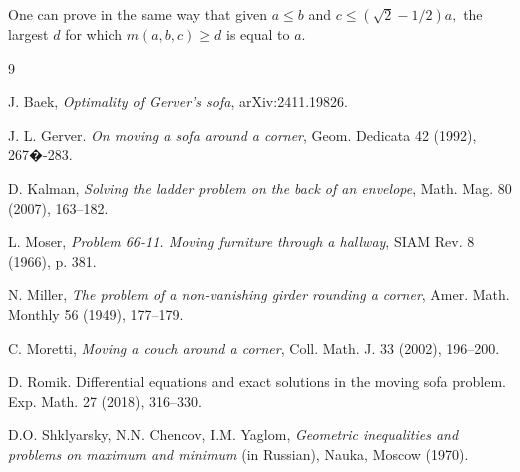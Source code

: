 \documentclass[12pt]{amsart}
\begin{document}
One can prove in the same way that given $a\le b$ and $c\le(\sqrt
2-1/2)a,$ the largest $d$ for which $m(a,b,c)\ge d$ is equal to $a.$

\begin{thebibliography}{9}

 J. Baek, {\it Optimality of Gerver's sofa}, arXiv:2411.19826.

 J. L. Gerver. {\it On moving a sofa around a corner}, Geom. Dedicata
42 (1992), 267�-283.

 D. Kalman, {\it Solving the ladder problem on the back of an envelope},
Math. Mag. 80 (2007), 163--182.

 L. Moser, {\it Problem 66-11. Moving furniture through a hallway}, SIAM
Rev. 8 (1966), p. 381.

 N. Miller, {\it The problem of a non-vanishing girder rounding a corner},
Amer. Math. Monthly 56 (1949), 177--179.

 C. Moretti, {\it Moving a couch around a corner}, Coll. Math. J.
33 (2002), 196--200.

 D. Romik. Differential equations and exact solutions in the
moving sofa problem. Exp. Math. 27 (2018), 316--330.

 D.O. Shklyarsky, N.N. Chencov, I.M. Yaglom, {\it
Geometric inequalities and problems on maximum and minimum} (in
Russian), Nauka, Moscow (1970).

\end{thebibliography}
\end{document}
